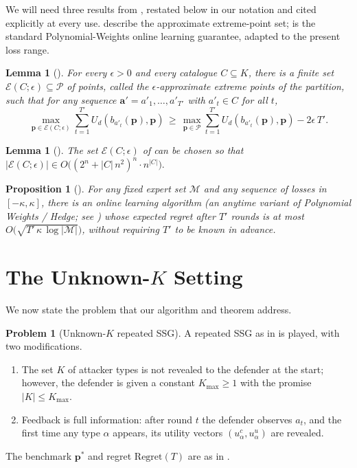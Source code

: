 \documentclass[letterpaper,9pt,twocolumn]{extarticle}
\newcommand{\pvec}{\mathbf{p}}
\newcommand{\avec}{\mathbf{a}}
\newcommand{\cP}{\mathcal{P}}
\newcommand{\cE}{\mathcal{E}}
\newcommand{\cM}{\mathcal{M}}
\newcommand{\Kmax}{K_{\max}}
\newcommand{\Regret}{\mathrm{Regret}}
\theoremstyle{plain}
\newtheorem{lemma}[theorem]{Lemma}
\newtheorem{proposition}[theorem]{Proposition}
\theoremstyle{definition}
\newtheorem{problem}[theorem]{Problem}
\theoremstyle{remark}
\begin{document}
We will need three results from \citet{balcan2015}, restated below in our
notation and cited explicitly at every use.  describe
the approximate extreme-point set;  is the standard
Polynomial-Weights online learning guarantee, adapted to the present loss
range.

\begin{lemma}[{\citealp[Lemma 4.3]{balcan2015}}]
\label{lem:43}
For every $\epsilon>0$ and every catalogue $C\subseteq K$, there is a
finite set $\cE(C;\epsilon)\subseteq \cP$ of points, called the
$\epsilon$-approximate extreme points of the partition, such that for any
sequence $\avec'=a'_1,\dots,a'_{T'}$ with $a'_t\in C$ for all $t$,
\[
\max_{\pvec\in\cE(C;\epsilon)}\!\sum_{t=1}^{T'}\!U_d(b_{a'_t}(\pvec),\pvec)\,\ge\,\max_{\pvec\in\cP}\!\sum_{t=1}^{T'}\!U_d(b_{a'_t}(\pvec),\pvec)-2\epsilon\,T'.
\]
\end{lemma}

\begin{lemma}[{\citealp[Lemma 4.4]{balcan2015}}]
\label{lem:44}
The set $\cE(C;\epsilon)$ of  can be chosen so that
\(|\cE(C;\epsilon)|\in O\!\bigl((2^n+|C|\,n^2)^n\cdot n^{|C|}\bigr).\)
\end{lemma}

\begin{proposition}[{\citealp[Proposition 1]{balcan2015}}]
\label{prop:hedge}
For any fixed expert set $\cM$ and any sequence of losses in
$[-\kappa,\kappa]$, there is an online learning algorithm (an anytime
variant of Polynomial Weights / Hedge; see \citealp[Sec.~2]{cesa2006}) whose
expected regret after $T'$ rounds is at most
$O\bigl(\sqrt{T'\,\kappa\,\log|\cM|}\bigr)$, without requiring $T'$ to be
known in advance.
\end{proposition}

\section{The Unknown-$K$ Setting}
\label{sec:unknownK}

We now state the problem that our algorithm and theorem address.

\begin{problem}[Unknown-$K$ repeated SSG]\label{prob:unknownK}
A repeated SSG as in  is played, with two modifications.
\begin{enumerate}[leftmargin=1.2em,itemsep=0.05em,topsep=0.2em]
  \item The set $K$ of attacker types is not revealed to the defender at
  the start; however, the defender is given a constant $\Kmax\ge 1$ with
  the promise $|K|\le\Kmax$.
  \item Feedback is full information: after round $t$ the defender
  observes $a_t$, and the first time any type $\alpha$ appears, its
  utility vectors $(u_\alpha^c,u_\alpha^u)$ are revealed.
\end{enumerate}
The benchmark $\pvec^{*}$ and regret $\Regret(T)$ are as in
.
\end{problem}
\end{document}
